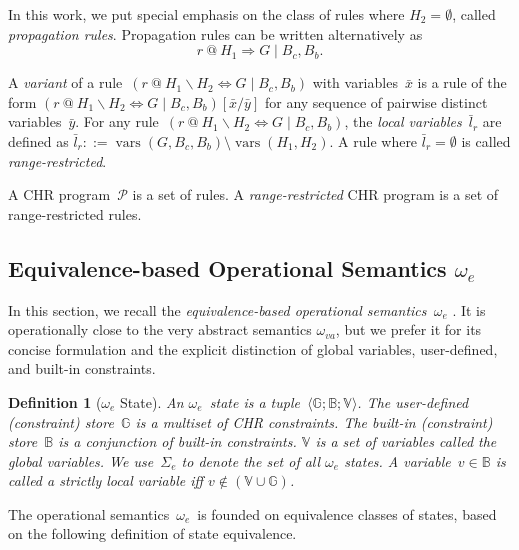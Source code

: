 \documentclass{tlp}
\newtheorem{definition}{Definition}[section]
\newcommand{\B}{\ensuremath{\mathbb{B}}}
\newcommand{\G}{\ensuremath{\mathbb{G}}}
\newcommand{\mcP}{\ensuremath{\mathcal{P}}}
\newcommand{\V}{\ensuremath{\mathbb{V}}}
\DeclareMathOperator{\vars}{vars}
\def\tuple#1{\langle #1 \rangle}
\newcommand{\stesq}[3]{\ensuremath{\tuple{#1; #2; #3}}}
\newcommand{\oesq}{\ensuremath{{\omega_e}}}
\newcommand{\Sesq}{\ensuremath{{\Sigma_e}}}
\begin{document}
In this work, we put special emphasis on the class of rules where $H_2 =
\emptyset$, called \emph{propagation rules}. Propagation rules can be written
alternatively as \[r\ @\ H_1 \Longrightarrow G \mid B_c, B_b.\]

A \emph{variant} of a rule~$(r\ @\ H_1 \backslash H_2 \Leftrightarrow G \mid B_c,
B_b)$ with variables~$\bar x$ is a rule of the form $(r\ @\ H_1 \backslash H_2
\Leftrightarrow G \mid B_c,B_b)[\bar x / \bar y]$ for any sequence of pairwise
distinct variables~$\bar y$. For any rule~$(r\ @\ H_1 \backslash H_2
\Leftrightarrow G \mid B_c, B_b)$, the \emph{local variables}~$\bar l_r$ are
defined as $\bar l_r ::= \vars(G,B_c,B_b) \setminus \vars(H_1,H_2)$. A rule where
$\bar l_r = \emptyset$ is called \emph{range-restricted}.

A CHR program~$\mcP$ is a set of rules. A \emph{range-restricted} CHR program is
a set of range-restricted rules.

\subsection{Equivalence-based Operational Semantics $\oesq$}

In this section, we recall the \emph{equivalence-based operational
semantics~\oesq} \cite{Raiser2009a}. It is operationally close to the very
abstract semantics $\omega_{va}$, but we prefer it for its concise formulation
and the explicit distinction of global variables, user-defined, and built-in
constraints.

\begin{definition}[$\oesq$ State]\label{def:m_state}
An {\em \oesq\ state} is a tuple~$\stesq{\G}{\B}{\V}$. The \emph{user-defined
(constraint) store}~$\G$ is a multiset of CHR constraints. The {\em built-in
(constraint) store}~$\B$ is a conjunction of built-in constraints. $\V$ is a set
of variables called the \emph{global variables}. We use~$\Sesq$ to denote the set
of all $\oesq$ states. A variable~$v \in \B$ is called a \emph{strictly local
variable} iff $v \not \in (\V \cup \G)$.
\end{definition}

The operational semantics~\oesq\ is founded on equivalence classes of
states, based on the following definition of state equivalence.
\end{document}
